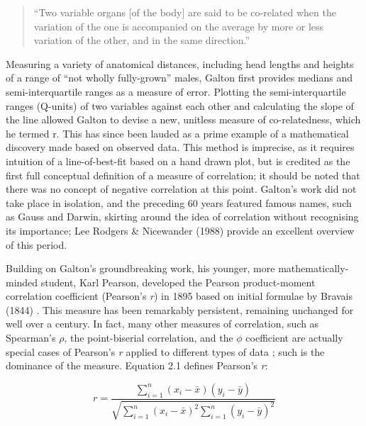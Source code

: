 \documentclass[../main.tex]{subfiles}
\begin{document}
\begin{quotation}
  ``Two variable organs [of the body] are said to be co-related when the variation of the one is accompanied on the average by more or less variation of the other, and in the same direction.''
\end{quotation}

Measuring a variety of anatomical distances, including head lengths and
heights of a range of ``not wholly fully-grown'' males, Galton first
provides medians and semi-interquartile ranges as a measure of error.
Plotting the semi-interquartile ranges (Q-units) of two variables
against each other and calculating the slope of the line allowed Galton
to devise a new, unitless measure of co-relatedness, which he termed r.
This has since been lauded as a prime example of a mathematical
discovery made based on observed data. This method is imprecise, as it
requires intuition of a line-of-best-fit based on a hand drawn plot, but
is credited as the first full conceptual definition of a measure of
correlation; it should be noted that there was no concept of negative
correlation at this point. Galton's work did not take place in
isolation, and the preceding 60 years featured famous names, such as
Gauss and Darwin, skirting around the idea of correlation without
recognising its importance; Lee Rodgers \& Nicewander (1988)
\cite{lee_1988} provide an excellent overview of this period.

Building on Galton's groundbreaking work, his younger, more
mathematically-minded student, Karl Pearson, developed the Pearson
product-moment correlation coefficient (Pearson's \emph{r}) in 1895
\cite{lee_1988} based on initial formulae by Bravais (1844)
\cite{bravais_1844}. This measure has been remarkably persistent,
remaining unchanged for well over a century. In fact, many other
measures of correlation, such as Spearman's \(\rho\), the point-biserial
correlation, and the \(\phi\) coefficient are actually special cases of
Pearson's \emph{r} applied to different types of data
\cite{henrysson_1971}; such is the dominance of the measure. Equation
2.1 defines Pearson's \emph{r}:

\begin{equation}
  r = \frac{\sum_{i=1}^{n} (x_i - \bar{x})(y_i - \bar{y})}{\sqrt{\sum_{i=1}^{n} (x_i - \bar{x})^2 \sum_{i=1}^{n} (y_i - \bar{y})^2}}
\end{equation}
\end{document}
